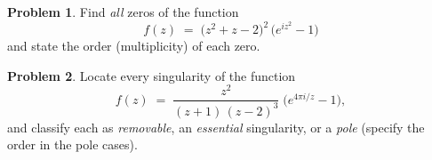 \documentclass[10pt]{article}
\theoremstyle{definition} %
\newtheorem{problem}{Problem}
\theoremstyle{plain} %
\begin{document}
                \begin{problem}
                Find \emph{all} zeros of the function
                \[
                  f(z)\;=\;\bigl(z^{2}+z-2\bigr)^{2}\,\bigl(e^{i z^{2}}-1\bigr)
                \]
                and state the order (multiplicity) of each zero.
                \end{problem}
                
                \begin{problem}
                Locate every singularity of the function
                \[
                  f(z)\;=\;\frac{z^{2}}{(z+1)\,(z-2)^{3}}\;\bigl(e^{4\pi i / z}-1\bigr),
                \]
                and classify each as \emph{removable}, an \emph{essential} singularity, or a \emph{pole} (specify the order in the pole cases).
                \end{problem}
                
\end{document}
